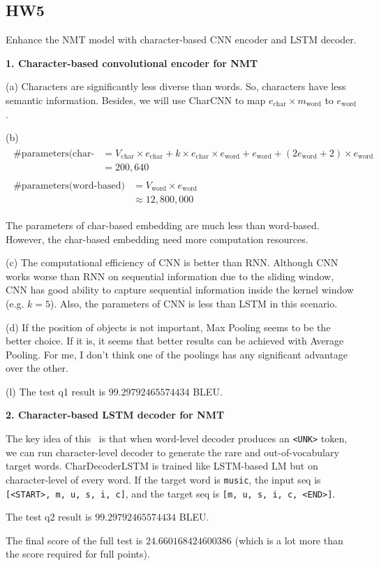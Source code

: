 \subsection{HW5}

Enhance the NMT model with character-based CNN encoder and LSTM decoder.

\textbf{1. Character-based convolutional encoder for NMT~\cite{CharCNN}}

(a) Characters are significantly less diverse than words. So, characters have less semantic information. Besides, we will use CharCNN to map $e_{\text{char}} \times m_{\text{word}}$ to $e_{\text{word}}$.

(b) \begin{align}
		\begin{split}
			\text{\#parameters(char-based)} &= V_{\text{char}} \times e_{\text{char}} + k \times e_{\text{char}} \times e_{\text{word}} + e_{\text{word}} + (2 e_{\text{word}} + 2) \times e_{\text{word}} \\
			&= 200,640
		\end{split} \nonumber \\
		\begin{split}
			\text{\#parameters(word-based)} &= V_{\text{word}} \times e_{\text{word}} \\
			&\approx 12,800,000
		\end{split} \nonumber
	\end{align}
	
	The parameters of char-based embedding are much less than word-based. However, the char-based embedding need more computation resources.
	
(c) The computational efficiency of CNN is better than RNN. Although CNN works worse than RNN on sequential information due to the sliding window, CNN has good ability to capture sequential information inside the kernel window (e.g. $k=5$). Also, the parameters of CNN is less than LSTM in this scenario.

(d) If the position of objects is not important, Max Pooling seems to be the better choice. If it is, it seems that better results can be achieved with Average Pooling. For me, I don’t think one of the poolings has any significant advantage over the other.

(l) The test q1 result is $99.29792465574434$ BLEU.

\textbf{2. Character-based LSTM decoder for NMT}

The key idea of this~\cite{CharDecoderLSTM} is that when word-level decoder produces an \texttt{<UNK>} token, we can run character-level decoder to generate the rare and out-of-vocabulary target words.
CharDecoderLSTM is trained like LSTM-based LM but on character-level of every word.
If the target word is \texttt{music}, the input seq is \texttt{[<START>, m, u, s, i, c]}, and the target seq is \texttt{[m, u, s, i, c, <END>]}.

The test q2 result is $99.29792465574434$ BLEU.

The final score of the full test is $24.660168424600386$ (which is a lot more than the score required for full points).